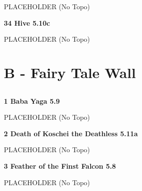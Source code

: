 \begin{multicols}{2}
			\begin{adjustwidth}{0.5cm}{}			
			PLACEHOLDER (No Topo)
			\end{adjustwidth}
			
			
			
			\needspace{1.5cm}
\label{rt:Hive}
\colorbox{RoyalBlue!20}{
\parbox{0.95\linewidth}{
\textbf{
34 Hive 5.10c  
}}}

			\begin{adjustwidth}{0.5cm}{}			
			PLACEHOLDER (No Topo)
			\end{adjustwidth}
			
			
		
	
\newpage
	
		\section{B - Fairy Tale Wall}\label{sa:Fairy Tale Wall}
	
	
	
		
		\needspace{1.5cm}
		\subsection*{}\label{bf:}
			
		
			
			\needspace{1.5cm}
\label{rt:Baba Yaga}
\colorbox{green!20}{
\parbox{0.95\linewidth}{
\textbf{
1 Baba Yaga 5.9  
}}}

			\begin{adjustwidth}{0.5cm}{}			
			PLACEHOLDER (No Topo)
			\end{adjustwidth}
			
			
			
			\needspace{1.5cm}
\label{rt:Death of Koschei the Deathless}
\colorbox{RoyalBlue!20}{
\parbox{0.95\linewidth}{
\textbf{
2 Death of Koschei the Deathless 5.11a  
}}}

			\begin{adjustwidth}{0.5cm}{}			
			PLACEHOLDER (No Topo)
			\end{adjustwidth}
			
			
			
			\needspace{1.5cm}
\label{rt:Feather of the Finst Falcon}
\colorbox{green!20}{
\parbox{0.95\linewidth}{
\textbf{
3 Feather of the Finst Falcon 5.8  
}}}

			\begin{adjustwidth}{0.5cm}{}			
			PLACEHOLDER (No Topo)
			\end{adjustwidth}
			

\end{multicols}
